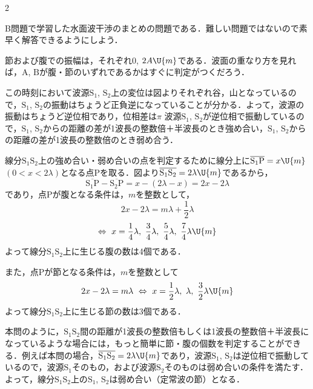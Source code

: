 \begin{multicols}{2}
\par\nopagebreak
\begin{sisin}
B問題で学習した水面波干渉のまとめの問題である．難しい問題ではないので素早く解答できるようにしよう．

節および腹での振幅は，それぞれ$0$, $2A\U{m}$である．波面の重なり方を見れば，$\mathrm{A}$, $\mathrm{B}$が腹・節のいずれであるかはすぐに判定がつくだろう．
\end{sisin}
\KaiHead
\begin{komon}
 この時刻において波源$\mathrm{S_1}$, $\mathrm{S_2}$上の変位は図よりそれぞれ谷，山となっているので，$\mathrm{S_1}$, $\mathrm{S_2}$の振動はちょうど正負逆になっていることが分かる．よって，波源の振動はちょうど逆位相であり，位相差は$\pi$\hspace*{\fill}\Ans
{} 波源$\mathrm{S_1}$, $\mathrm{S_2}$が逆位相で振動しているので，$\mathrm{S_1}$, $\mathrm{S_2}$からの距離の差が1波長の整数倍＋半波長のとき強め合い，$\mathrm{S_1}$, $\mathrm{S_2}$からの距離の差が1波長の整数倍のとき弱め合う．

       線分$\mathrm{S_1S_2}$上の強め合い・弱め合いの点を判定するために線分上に$\overline{\mathrm{S_1P}}=x\U{m}$ $(0<x<2\lambda)$となる点$\mathrm{P}$を取る．図より$\overline{\mathrm{S_1S_2}}=2\lambda\U{m}$であるから，
       \[\overline{\mathrm{S_1P}}-\overline{\mathrm{S_2P}}=x-(2\lambda-x)=2x-2\lambda\]
       であり，点$\mathrm{P}$が腹となる条件は，$m$を整数として，
       \[2x-2\lambda=m\lambda+\frac{1}{2}\lambda\]
       \[\Leftrightarrow\ x=\frac{1}{4}\lambda,\ \frac{3}{4}\lambda,\ \frac{5}{4}\lambda,\ \frac{7}{4}\lambda\U{m}\]
       よって線分$\mathrm{S_1S_2}$上に生じる腹の数は{\gtfamily 4個}である．\hspace*{\fill}\Ans

       また，点$\mathrm{P}$が節となる条件は，$m$を整数として
       \[2x-2\lambda=m\lambda\ \Leftrightarrow\ x=\frac{1}{2}\lambda,\ \lambda,\ \frac{3}{2}\lambda\U{m}\]
       よって線分$\mathrm{S_1S_2}$上に生じる節の数は{\gtfamily 3個}である．\hspace*{\fill}\Ans
\end{komon}
\begin{bekkai}
本問のように，$\mathrm{S_1S_2}$間の距離が1波長の整数倍もしくは1波長の整数倍＋半波長になっているような場合には，もっと簡単に節・腹の個数を判定することができる．例えば本問の場合，$\overline{\mathrm{S_1S_2}}=2\lambda\U{m}$であり，波源$\mathrm{S_1}$, $\mathrm{S_2}$は逆位相で振動しているので，波源$\mathrm{S_1}$そのもの，および波源$\mathrm{S_2}$そのものは弱め合いの条件を満たす．よって，線分$\mathrm{S_1S_2}$上の$\mathrm{S_1}$, $\mathrm{S_2}$は弱め合い（定常波の節）となる．


\end{bekkai}
\end{multicols}
